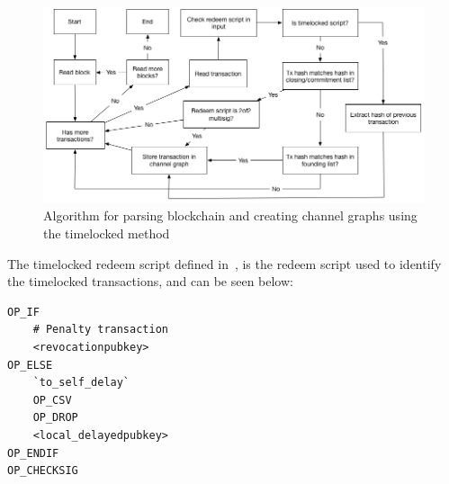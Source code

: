 \begin{figure}[h]
    \centering
    \includegraphics[width=12cm]{figures/algo2.png}
    \caption{Algorithm for parsing blockchain and creating channel graphs using the timelocked method}
    \label{fig:algo2}
\end{figure}

The timelocked redeem script defined in~\cite{bolt3}, is the redeem script used to identify the timelocked transactions, and can be seen below:

\begin{verbatim}
OP_IF
    # Penalty transaction
    <revocationpubkey>
OP_ELSE
    `to_self_delay`
    OP_CSV
    OP_DROP
    <local_delayedpubkey>
OP_ENDIF
OP_CHECKSIG
\end{verbatim}


